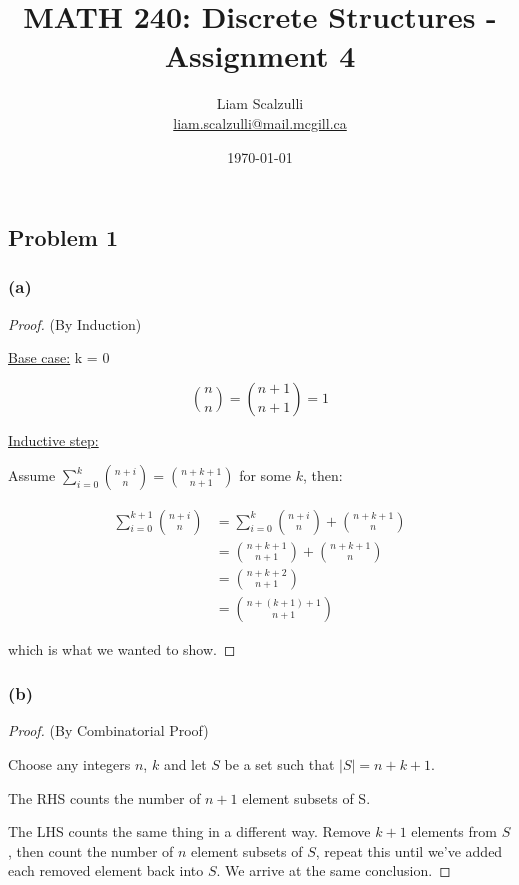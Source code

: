 \documentclass[10pt]{article}
\title{MATH 240: Discrete Structures - Assignment 4}
\author{Liam Scalzulli\\
\href{mailto:liam.scalzulli@mail.mcgill.ca}{liam.scalzulli@mail.mcgill.ca}}
\date{\today}
\begin{document}
\maketitle

\subsection*{Problem 1}

\subsubsection*{(a)}

\begin{proof}
  (By Induction)
  \spacing

  \noindent
  \underline{Base case:} k = 0
  \spacing

  \noindent
  $${n \choose n} = {n + 1 \choose n + 1} = 1$$
  \spacing

  \noindent
  \underline{Inductive step:}
  \spacing

  \noindent
  Assume $\sum_{i = 0}^{k}{n + i \choose n} = {n + k + 1 \choose n + 1}$ for some $k$, then:

  \begin{align*}
   \sum_{i = 0}^{k + 1}{n + i \choose n} &= \sum_{i = 0}^{k}{n + i \choose n} + {n + k + 1 \choose n} \\
     &= {n + k + 1 \choose n + 1} + {n + k + 1 \choose n} \\
     &= {n + k + 2 \choose n + 1} \\
     &= {n + (k + 1) + 1 \choose n + 1}
  \end{align*}

  \noindent
  which is what we wanted to show.
\end{proof}

\subsubsection*{(b)}

\begin{proof}
  (By Combinatorial Proof)
  \spacing

  \noindent
  Choose any integers $n$, $k$ and let $S$ be a set such that $|S| = n + k + 1$.
  \spacing

  \noindent
  The RHS counts the number of $n + 1$ element subsets of S.
  \spacing

  \noindent
  The LHS counts the same thing in a different way. Remove $k + 1$ elements
  from $S$, then count the number of $n$ element subsets of $S$, repeat this
  until we've added each removed element back into $S$. We arrive at the same conclusion.
\end{proof}
\end{document}
